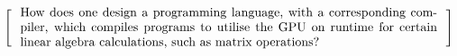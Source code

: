 \[
  \left[
  \begin{minipage}{\textwidth}
  \centering
  \begin{minipage}{0.96\textwidth}
  How does one design a programming language, with a corresponding compiler, which compiles programs to utilise the GPU on runtime for certain linear algebra calculations, such as matrix operations?
  
  



  \end{minipage}
  \end{minipage}
    \right]
\]